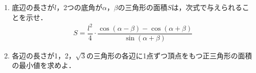 \documentclass[../../main.tex]{subfiles}
\begin{document}
\begin{enumerate}
  \item 底辺の長さが$l$，2つの底角が$\alpha$，$\beta$の三角形の面積$S$は，次式で与えられることを示せ．
    \begin{align}
      S=\dfrac{l^2}{4}\cdot\dfrac{\cos(\alpha-\beta)-\cos(\alpha+\beta)}{\sin(\alpha+\beta)}
    \end{align}
  \item 各辺の長さが1，2，$\sqrt{3}$の三角形の各辺に1点ずつ頂点をもつ正三角形の面積の最小値を求めよ．
\end{enumerate}
\end{document}
